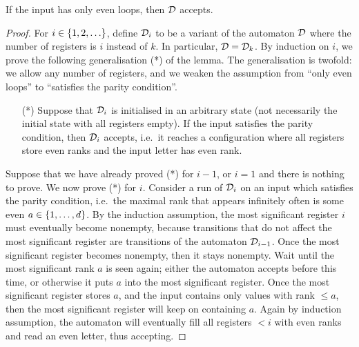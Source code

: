 \begin{lemma}\label{claim:parity}
	If the input has only even loops, then  $\mathcal{D}$  accepts.
\end{lemma}
\begin{proof}  For $i \in \{1,2,\ldots\}$, define $\mathcal{D}_i$ to be a variant of the automaton $\mathcal{D}$ where the number of registers is $i$ instead of $k$. In particular, $\mathcal{D}=\mathcal{D}_k$. By induction on $i$, we prove the following generalisation (*) of the lemma.  The generalisation is twofold: we allow any number of registers, and we weaken the assumption from ``only even loops'' to ``satisfies the parity condition''.
\begin{itemize}
	\item [(*)] Suppose that $\mathcal{D}_i$ is initialised in an arbitrary  
	 state (not necessarily the initial state with all registers empty). If the input satisfies the parity condition, then $\mathcal{D}_i$ accepts, i.e.~it reaches a configuration where all registers store even ranks and the input letter has  even rank.
\end{itemize}
Suppose that we have already proved (*) for $i-1$, or $i=1$ and there is nothing to prove. We now prove  (*)  for $i$. Consider a run of $\mathcal{D}_i$ on an input which satisfies the parity condition, i.e.~the maximal rank that appears infinitely often is some even $a \in \{1,\ldots,d\}$. By the induction assumption, the most significant register $i$ must eventually become nonempty, because transitions that do not affect the most significant register are transitions of the automaton $\mathcal{D}_{i-1}$. Once the most significant register becomes nonempty, then it stays nonempty. Wait until the most significant rank $a$ is seen again; either the automaton accepts before this time, or otherwise it puts $a$ into the most significant register. Once the most significant register stores $a$, and the input contains only values with rank $\le a$, then the most significant register will keep on containing $a$. Again by induction assumption, the automaton will eventually fill all registers $<i$ with even ranks and read an even letter, thus accepting.
\end{proof}



